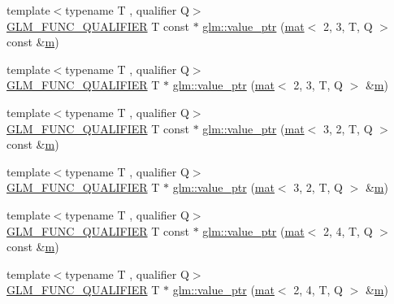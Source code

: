 \begin{DoxyCompactItemize}
\item 
{\footnotesize template$<$typename T , qualifier Q$>$ }\\\hyperlink{setup_8hpp_a33fdea6f91c5f834105f7415e2a64407}{G\+L\+M\+\_\+\+F\+U\+N\+C\+\_\+\+Q\+U\+A\+L\+I\+F\+I\+ER} T const  $\ast$ \hyperlink{group__gtc__type__ptr_ga2be1ab45c7a864986baac31557910adb}{glm\+::value\+\_\+ptr} (\hyperlink{structglm_1_1mat}{mat}$<$ 2, 3, T, Q $>$ const \&\hyperlink{_s_d_l__opengl__glext_8h_af593500c283bf1a787a6f947f503a5c2}{m})
\item 
{\footnotesize template$<$typename T , qualifier Q$>$ }\\\hyperlink{setup_8hpp_a33fdea6f91c5f834105f7415e2a64407}{G\+L\+M\+\_\+\+F\+U\+N\+C\+\_\+\+Q\+U\+A\+L\+I\+F\+I\+ER} T $\ast$ \hyperlink{group__gtc__type__ptr_gab420b07b29bb3bb1cec07b6c31725fef}{glm\+::value\+\_\+ptr} (\hyperlink{structglm_1_1mat}{mat}$<$ 2, 3, T, Q $>$ \&\hyperlink{_s_d_l__opengl__glext_8h_af593500c283bf1a787a6f947f503a5c2}{m})
\item 
{\footnotesize template$<$typename T , qualifier Q$>$ }\\\hyperlink{setup_8hpp_a33fdea6f91c5f834105f7415e2a64407}{G\+L\+M\+\_\+\+F\+U\+N\+C\+\_\+\+Q\+U\+A\+L\+I\+F\+I\+ER} T const  $\ast$ \hyperlink{group__gtc__type__ptr_ga0c9f0f561c848ec89d34977eff6a7b17}{glm\+::value\+\_\+ptr} (\hyperlink{structglm_1_1mat}{mat}$<$ 3, 2, T, Q $>$ const \&\hyperlink{_s_d_l__opengl__glext_8h_af593500c283bf1a787a6f947f503a5c2}{m})
\item 
{\footnotesize template$<$typename T , qualifier Q$>$ }\\\hyperlink{setup_8hpp_a33fdea6f91c5f834105f7415e2a64407}{G\+L\+M\+\_\+\+F\+U\+N\+C\+\_\+\+Q\+U\+A\+L\+I\+F\+I\+ER} T $\ast$ \hyperlink{group__gtc__type__ptr_gacd2f2c950912a073f6f77494df9e42a6}{glm\+::value\+\_\+ptr} (\hyperlink{structglm_1_1mat}{mat}$<$ 3, 2, T, Q $>$ \&\hyperlink{_s_d_l__opengl__glext_8h_af593500c283bf1a787a6f947f503a5c2}{m})
\item 
{\footnotesize template$<$typename T , qualifier Q$>$ }\\\hyperlink{setup_8hpp_a33fdea6f91c5f834105f7415e2a64407}{G\+L\+M\+\_\+\+F\+U\+N\+C\+\_\+\+Q\+U\+A\+L\+I\+F\+I\+ER} T const  $\ast$ \hyperlink{group__gtc__type__ptr_ga81f821818736c8cb80a899cf5819aac9}{glm\+::value\+\_\+ptr} (\hyperlink{structglm_1_1mat}{mat}$<$ 2, 4, T, Q $>$ const \&\hyperlink{_s_d_l__opengl__glext_8h_af593500c283bf1a787a6f947f503a5c2}{m})
\item 
{\footnotesize template$<$typename T , qualifier Q$>$ }\\\hyperlink{setup_8hpp_a33fdea6f91c5f834105f7415e2a64407}{G\+L\+M\+\_\+\+F\+U\+N\+C\+\_\+\+Q\+U\+A\+L\+I\+F\+I\+ER} T $\ast$ \hyperlink{group__gtc__type__ptr_ga4c03b3900c5a82d8915b0c8c6d5dce4e}{glm\+::value\+\_\+ptr} (\hyperlink{structglm_1_1mat}{mat}$<$ 2, 4, T, Q $>$ \&\hyperlink{_s_d_l__opengl__glext_8h_af593500c283bf1a787a6f947f503a5c2}{m})

\end{DoxyCompactItemize}

